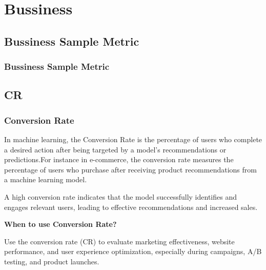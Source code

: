 \chapter{Bussiness}


\clearpage
\thispagestyle{businessstyle}
\section{Bussiness Sample Metric}
\subsection{Bussiness Sample Metric}

\clearpage
\thispagestyle{businessstyle}

\section{CR}

\subsection{Conversion Rate}
In machine learning, the Conversion Rate is the percentage of users who complete a desired action after being targeted by a model's recommendations or predictions.For instance in e-commerce, the conversion rate measures the percentage of users who purchase after receiving product recommendations from a machine learning model.

\begin{center}
\end{center}

\vspace{-10pt}

A high conversion rate indicates that the model successfully identifies and engages relevant users, leading to effective recommendations and increased sales.

\textbf{When to use Conversion Rate?}

Use the conversion rate (CR) to evaluate marketing effectiveness, website performance, and user experience optimization, especially during campaigns, A/B testing, and product launches.

